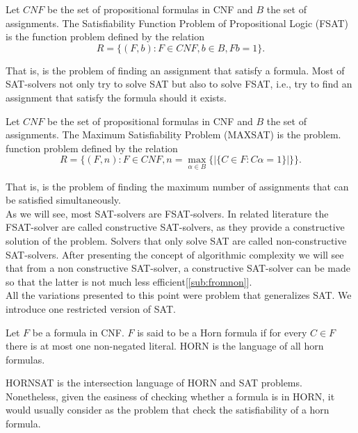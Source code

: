 \begin{definition}
  Let $CNF$ be the set of propositional formulas in CNF and $B$ the set of assignments.  The Satisfiability Function Problem of Propositional Logic (FSAT) is the function problem defined by the relation $$R=\{(F, b): F\in CNF, b \in B, Fb = 1\}.$$
\end{definition}
That is, is the problem of finding an assignment that satisfy a formula. Most of SAT-solvers not only try to solve SAT but also to solve FSAT, i.e., try to find an assignment that satisfy  the formula should it exists.
\begin{definition}
  Let $CNF$ be the set of propositional formulas in CNF and $B$ the set of assignments. The Maximum Satisfiability Problem (MAXSAT) is the problem. function problem defined by the relation $$R=\{(F,n) : F\in CNF, n = \max_{\alpha \in B}\{ | \{C\in F : C\alpha =1 \}| \}\}.$$
\end{definition}

That is, is the problem of finding the maximum number of assignments that can be satisfied simultaneously.\\

As we will see, most SAT-solvers are FSAT-solvers. In related literature the FSAT-solver are called constructive SAT-solvers, as they provide a constructive solution of the problem. Solvers that only solve SAT are called non-constructive SAT-solvers. After presenting the concept of algorithmic complexity we will see that from a non constructive SAT-solver, a constructive SAT-solver can be made so that the latter is not much less efficient[\ref{sub:fromnon}].\\

All the variations presented to this point were problem that generalizes SAT. We introduce one restricted version of SAT.

\begin{definition}
  Let $F$ be a formula in CNF. $F$ is said to be a Horn formula if for every $C \in F$ there is at most one non-negated literal. HORN is the language of all horn formulas.
\end{definition}

\begin{definition}
  HORNSAT is the intersection language of HORN and SAT problems. Nonetheless, given the easiness of checking whether a formula is in HORN, it would usually consider as the problem that check the satisfiability of a horn formula.
\end{definition}

